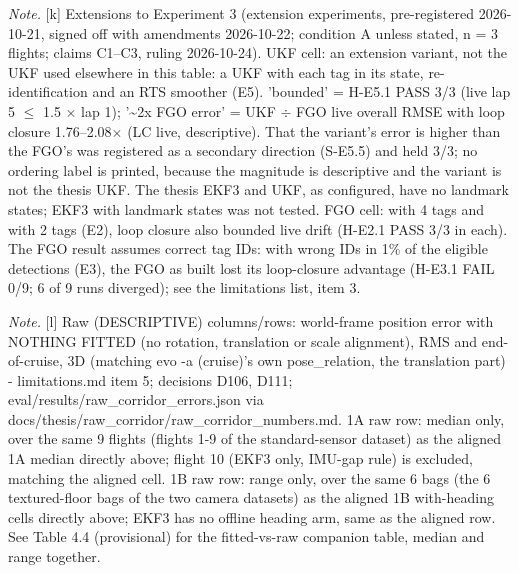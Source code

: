 \begin{table}[htbp]
\textit{Note.} [k] Extensions to Experiment 3 (extension experiments, pre-registered 2026-10-21, signed off with amendments 2026-10-22; condition A unless stated, n = 3 flights; claims C1--C3, ruling 2026-10-24). UKF cell: an extension variant, not the UKF used elsewhere in this table: a UKF with each tag in its state, re-identification and an RTS smoother (E5). 'bounded' = H-E5.1 PASS 3/3 (live lap 5 $\le$ 1.5 $\times$ lap 1); '\textasciitilde{}2x FGO error' = UKF $\div$ FGO live overall RMSE with loop closure 1.76--2.08$\times$ (LC live, descriptive). That the variant's error is higher than the FGO's was registered as a secondary direction (S-E5.5) and held 3/3; no ordering label is printed, because the magnitude is descriptive and the variant is not the thesis UKF. The thesis EKF3 and UKF, as configured, have no landmark states; EKF3 with landmark states was not tested. FGO cell: with 4 tags and with 2 tags (E2), loop closure also bounded live drift (H-E2.1 PASS 3/3 in each). The FGO result assumes correct tag IDs: with wrong IDs in 1\% of the eligible detections (E3), the FGO as built lost its loop-closure advantage (H-E3.1 FAIL 0/9; 6 of 9 runs diverged); see the limitations list, item 3.\par
\textit{Note.} [l] Raw (DESCRIPTIVE) columns/rows: world-frame position error with NOTHING FITTED (no rotation, translation or scale alignment), RMS and end-of-cruise, 3D (matching evo -a (cruise)'s own pose\_relation, the translation part) - limitations.md item 5; decisions D106, D111; eval/results/raw\_corridor\_errors.json via docs/thesis/raw\_corridor/raw\_corridor\_numbers.md. 1A raw row: median only, over the same 9 flights (flights 1-9 of the standard-sensor dataset) as the aligned 1A median directly above; flight 10 (EKF3 only, IMU-gap rule) is excluded, matching the aligned cell. 1B raw row: range only, over the same 6 bags (the 6 textured-floor bags of the two camera datasets) as the aligned 1B with-heading cells directly above; EKF3 has no offline heading arm, same as the aligned row. See Table 4.4 (provisional) for the fitted-vs-raw companion table, median and range together.\par
\end{table}
